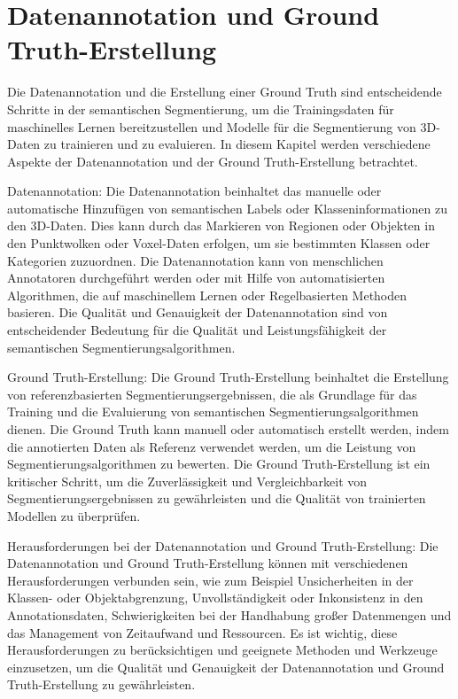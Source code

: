 \section{Datenannotation und Ground Truth-Erstellung}

Die Datenannotation und die Erstellung einer Ground Truth sind entscheidende
Schritte in der semantischen Segmentierung, um die Trainingsdaten für
maschinelles Lernen bereitzustellen und Modelle für die Segmentierung von
3D-Daten zu trainieren und zu evaluieren. In diesem Kapitel werden verschiedene
Aspekte der Datenannotation und der Ground Truth-Erstellung betrachtet.

Datenannotation: Die Datenannotation beinhaltet das manuelle oder automatische
Hinzufügen von semantischen Labels oder Klasseninformationen zu den 3D-Daten.
Dies kann durch das Markieren von Regionen oder Objekten in den Punktwolken
oder Voxel-Daten erfolgen, um sie bestimmten Klassen oder Kategorien
zuzuordnen. Die Datenannotation kann von menschlichen Annotatoren durchgeführt
werden oder mit Hilfe von automatisierten Algorithmen, die auf maschinellem
Lernen oder Regelbasierten Methoden basieren. Die Qualität und Genauigkeit der
Datenannotation sind von entscheidender Bedeutung für die Qualität und
Leistungsfähigkeit der semantischen Segmentierungsalgorithmen.

Ground Truth-Erstellung: Die Ground Truth-Erstellung beinhaltet die Erstellung
von referenzbasierten Segmentierungsergebnissen, die als Grundlage für das
Training und die Evaluierung von semantischen Segmentierungsalgorithmen dienen.
Die Ground Truth kann manuell oder automatisch erstellt werden, indem die
annotierten Daten als Referenz verwendet werden, um die Leistung von
Segmentierungsalgorithmen zu bewerten. Die Ground Truth-Erstellung ist ein
kritischer Schritt, um die Zuverlässigkeit und Vergleichbarkeit von
Segmentierungsergebnissen zu gewährleisten und die Qualität von trainierten
Modellen zu überprüfen.

Herausforderungen bei der Datenannotation und Ground Truth-Erstellung: Die
Datenannotation und Ground Truth-Erstellung können mit verschiedenen
Herausforderungen verbunden sein, wie zum Beispiel Unsicherheiten in der
Klassen- oder Objektabgrenzung, Unvollständigkeit oder Inkonsistenz in den
Annotationsdaten, Schwierigkeiten bei der Handhabung großer Datenmengen und das
Management von Zeitaufwand und Ressourcen. Es ist wichtig, diese
Herausforderungen zu berücksichtigen und geeignete Methoden und Werkzeuge
einzusetzen, um die Qualität und Genauigkeit der Datenannotation und Ground
Truth-Erstellung zu gewährleisten.